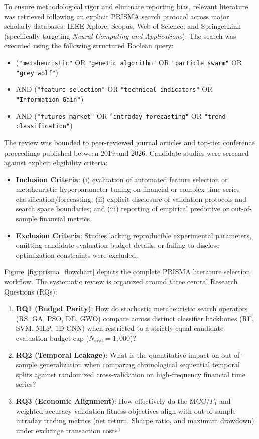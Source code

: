 To ensure methodological rigor and eliminate reporting bias, relevant literature was retrieved following an explicit PRISMA search protocol across major scholarly databases: IEEE Xplore, Scopus, Web of Science, and SpringerLink (specifically targeting \textit{Neural Computing and Applications}). The search was executed using the following structured Boolean query:
\begin{itemize}
    \item (\texttt{"metaheuristic"} OR \texttt{"genetic algorithm"} OR \texttt{"particle swarm"} OR \texttt{"grey wolf"})
    \item AND (\texttt{"feature selection"} OR \texttt{"technical indicators"} OR \texttt{"Information Gain"})
    \item AND (\texttt{"futures market"} OR \texttt{"intraday forecasting"} OR \texttt{"trend classification"})
\end{itemize}

The review was bounded to peer-reviewed journal articles and top-tier conference proceedings published between 2019 and 2026. Candidate studies were screened against explicit eligibility criteria:
\begin{itemize}
    \item \textbf{Inclusion Criteria}: (i) evaluation of automated feature selection or metaheuristic hyperparameter tuning on financial or complex time-series classification/forecasting; (ii) explicit disclosure of validation protocols and search space boundaries; and (iii) reporting of empirical predictive or out-of-sample financial metrics.
    \item \textbf{Exclusion Criteria}: Studies lacking reproducible experimental parameters, omitting candidate evaluation budget details, or failing to disclose optimization constraints were excluded.
\end{itemize}

Figure~\ref{fig:prisma_flowchart} depicts the complete PRISMA literature selection workflow. The systematic review is organized around three central Research Questions (RQs):
\begin{enumerate}
    \item \textbf{RQ1 (Budget Parity)}: How do stochastic metaheuristic search operators (RS, GA, PSO, DE, GWO) compare across distinct classifier backbones (RF, SVM, MLP, 1D-CNN) when restricted to a strictly equal candidate evaluation budget cap ($N_{\mathrm{eval}} = 1{,}000$)?
    \item \textbf{RQ2 (Temporal Leakage)}: What is the quantitative impact on out-of-sample generalization when comparing chronological sequential temporal splits against randomized cross-validation on high-frequency financial time series?
    \item \textbf{RQ3 (Economic Alignment)}: How effectively do the MCC/$F_1$ and weighted-accuracy validation fitness objectives align with out-of-sample intraday trading metrics (net return, Sharpe ratio, and maximum drawdown) under exchange transaction costs?
\end{enumerate}

